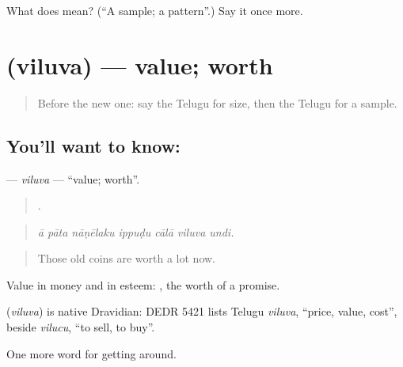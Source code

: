 \begin{tcolorbox}[breakable,colback=teal!4,colframe=teal!35!black,title={Before you move on}]
What does  mean? (\textquotedblleft{}A sample; a pattern\textquotedblright{}.) Say it once more.
\end{tcolorbox}
\section[\texorpdfstring{\te{విలువ} (viluva)}{విలువ (viluva)}]{ (viluva) — value; worth}

\label{lesson:TE-C486-viluva}



\begin{quote}
Before the new one: say the Telugu for size, then the Telugu for a sample.
\end{quote}

\subsection*{You'll want to know: }
\textbf{} — \emph{viluva} — \textquotedblleft{}value; worth\textquotedblright{}.

\begin{quote}
      .
\end{quote}

\begin{quote}
\emph{ā pāta nāṇēlaku ippuḍu cālā viluva undi.}
\end{quote}

\begin{quote}
Those old coins are worth a lot now.
\end{quote}

Value in money and in esteem:  , the worth of a promise.

\begin{cousinweb}
\textbf{} (\emph{viluva}) is native Dravidian: DEDR 5421 lists Telugu \emph{viluva}, \textquotedblleft{}price, value, cost\textquotedblright{}, beside \emph{vilucu}, \textquotedblleft{}to sell, to buy\textquotedblright{}.
\end{cousinweb}

\begin{grammarlens}[title={What you've built}]
One more word for getting around.
\end{grammarlens}

